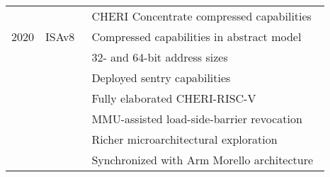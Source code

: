 \begin{tabular}{llp{3.25in}}
  & & CHERI Concentrate compressed capabilities \smallskip \\
  2020 & ISAv8~\cite{UCAM-CL-TR-951} & Compressed capabilities in abstract
  model \\
  & & 32- and 64-bit address sizes \\
  & & Deployed sentry capabilities \\
  & & Fully elaborated CHERI-RISC-V \\
  & & MMU-assisted load-side-barrier revocation \\
  & & Richer microarchitectural exploration \\
  & & Synchronized with Arm Morello architecture~\cite{arm-morello} \\
\bottomrule
\end{tabular}
